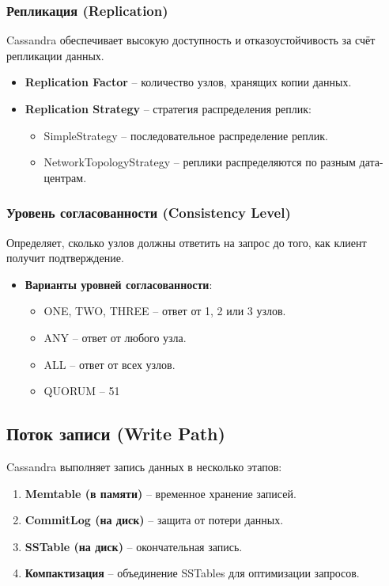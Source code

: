 \documentclass[a4paper,12pt]{article}
\begin{document}
\subsubsection{Репликация (Replication)}
Cassandra обеспечивает высокую доступность и отказоустойчивость за счёт репликации данных.
\begin{itemize}
    \item \textbf{Replication Factor} – количество узлов, хранящих копии данных.
    \item \textbf{Replication Strategy} – стратегия распределения реплик:
    \begin{itemize}
        \item SimpleStrategy – последовательное распределение реплик.
        \item NetworkTopologyStrategy – реплики распределяются по разным дата-центрам.
    \end{itemize}
\end{itemize}

\subsubsection{Уровень согласованности (Consistency Level)}
Определяет, сколько узлов должны ответить на запрос до того, как клиент получит подтверждение.
\begin{itemize}
    \item \textbf{Варианты уровней согласованности}:
    \begin{itemize}
        \item ONE, TWO, THREE – ответ от 1, 2 или 3 узлов.
        \item ANY – ответ от любого узла.
        \item ALL – ответ от всех узлов.
        \item QUORUM – 51%
    \end{itemize}
\end{itemize}

\subsection{Поток записи (Write Path)}
Cassandra выполняет запись данных в несколько этапов:
\begin{enumerate}
    \item \textbf{Memtable (в памяти)} – временное хранение записей.
    \item \textbf{CommitLog (на диск)} – защита от потери данных.
    \item \textbf{SSTable (на диск)} – окончательная запись.
    \item \textbf{Компактизация} – объединение SSTables для оптимизации запросов.
\end{enumerate}
\end{document}

